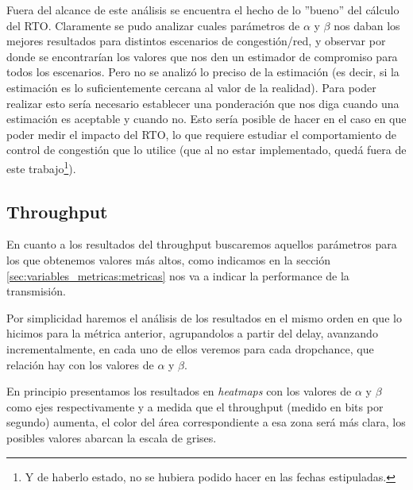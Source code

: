 \par Fuera del alcance de este an\'alisis se encuentra el hecho de lo ''bueno''
del c\'alculo del RTO. Claramente se pudo analizar cuales par\'ametros de
$\alpha$ y $\beta$ nos daban los mejores resultados para distintos escenarios de
congesti\'on/red, y observar por donde se encontrar\'ian los valores que nos den
un estimador de compromiso para todos los escenarios. Pero no se analiz\'o lo
preciso de la estimaci\'on (es decir, si la estimaci\'on es lo suficientemente
cercana al valor de la realidad). Para poder realizar esto ser\'ia necesario
establecer una ponderaci\'on que nos diga cuando una estimaci\'on es aceptable y
cuando no. Esto ser\'ia posible de hacer en el caso en que poder medir el
impacto del RTO, lo que requiere estudiar el comportamiento de control de
congesti\'on que lo utilice (que al no estar implementado, qued\'a fuera de este
trabajo\footnote{Y de haberlo estado, no se hubiera podido hacer en las fechas
estipuladas.}).

\FloatBarrier

\subsection{Throughput}\label{sec:resultados:throughput}

\par En cuanto a los resultados del throughput buscaremos aquellos par\'ametros
para los que obtenemos valores m\'as altos, como indicamos en la secci\'on
\ref{sec:variables_metricas:metricas} nos va a indicar la performance de la
transmisi\'on.

\par Por simplicidad haremos el an\'alisis de los resultados en el mismo orden
en que lo hicimos para la m\'etrica anterior, agrupandolos a partir del delay,
avanzando incrementalmente, en cada uno de ellos veremos para cada dropchance,
que relaci\'on hay con los valores de $\alpha$ y $\beta$.

\par En principio presentamos los resultados en \emph{heatmaps} con los valores
de $\alpha$ y $\beta$ como ejes respectivamente y a medida que el throughput
(medido en bits por segundo) aumenta, el color del \'area correspondiente a esa
zona ser\'a m\'as clara, los posibles valores abarcan la escala de grises.

